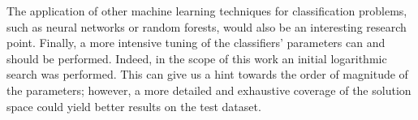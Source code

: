 \documentclass[11pt]{article}
\begin{document}
The application of other machine learning techniques for classification problems, such as neural networks or random forests, would also be an interesting research point. Finally, a more intensive tuning of the classifiers' parameters can and should be performed. Indeed, in the scope of this work an initial logarithmic search was performed. This can give us a hint towards the order of magnitude of the parameters; however, a more detailed and exhaustive coverage of the solution space could yield better results on the test dataset.



\end{document}
